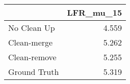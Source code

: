 \begin{tabular}{lr}
\toprule
{} & LFR_mu_15 \\
\midrule
No Clean Up  &     4.559 \\
Clean-merge  &     5.262 \\
Clean-remove &     5.255 \\
Ground Truth &     5.319 \\
\bottomrule
\end{tabular}
